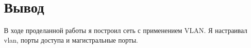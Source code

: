\chapter{Вывод}
В ходе проделанной работы я построил сеть с применением VLAN. Я настраивал vlan, порты доступа и магистральные порты.